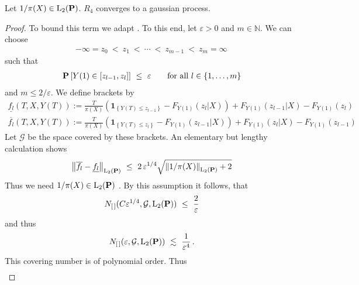 \begin{lemma}
  \label{aa:mean:l:r4}
  Let
  $1/\pi(X)\in\mathrm{L}_2(\P)$.
  $R_4$ converges to a gaussian process.
\end{lemma}
\begin{proof}
  To bound this term we adapt \cite[Example~19.6]{Vaart2000}.
  To this end, let $\varepsilon>0$ and $m\in\mathbb{N}$. We can choose
  \begin{gather}
  -\infty=z_0\ <\ z_1\ <\ \cdots\ <\ z_{m-1}\ <\ z_m=\infty
  \,
  \end{gather}
  such that
  \begin{gather}
    \P
    \left[ 
      Y(1)\in \left[ z_{l-1},z_l \right]
    \right]
    \ 
    \le
    \ 
    \varepsilon
    \qquad
    \text{for all}\ 
    l\in \left\{ 1,\ldots,m \right\}
  \end{gather}
  and $m \le 2/\varepsilon$.
  We define brackets by
  \begin{align}
    \underline{f_l}(T,X,Y(T))
    :=
    \frac{T}{\pi(X)}
    \left( 
      \mathbf{1}_{\left\{ Y(T)\le z_{l-1} \right\}}
      -
      F_{Y(1)}(z_l|X)
    \right)
    +
    F_{Y(1)}(z_{l-1}|X)
-
      F_{Y(1)}(z_l)
      \\
    \overline{f_l}(T,X,Y(T))
    :=
    \frac{T}{\pi(X)}
    \left( 
      \mathbf{1}_{\left\{ Y(T)\le z_{l} \right\}}
      -
      F_{Y(1)}(z_{l-1}|X)
    \right)
    +
    F_{Y(1)}(z_{l}|X)
-
F_{Y(1)}(z_{l-1})
  \end{align}
  Let $\mathcal{G}$ be the space covered by these brackets. 
  An elementary but lengthy calculation shows
  \begin{gather}
      \norm{
    \overline{f_l}
-
    \underline{f_l}
    }_{\mathrm{L}_2(\P)}
    \ 
    \le
    \ 
    2
    \,
    \varepsilon^{1/4}
    \sqrt{
      \norm{1/\pi(X)}_{\mathrm{L}_2(\P)}
      +
      2
    }
  \end{gather}
  Thus we need 
  $1/\pi(X)\in\mathrm{L}_2(\P)$
  . By this assumption it 
  follows, that
  \begin{gather}
    N_{[\,]}(C\varepsilon^{1/4}, \mathcal{G},\mathrm{L}_2(\P))
    \ 
    \le
    \ 
    \frac{2}{\varepsilon}
  \end{gather}
  and thus
\begin{gather}
    N_{[\,]}(\varepsilon, \mathcal{G},\mathrm{L}_2(\P))
    \ 
    \lesssim
    \ 
    \frac{1}{\varepsilon^4}  
    \,.
\end{gather}
This covering number is of polynomial order. Thus
\begin{gather}

\end{gather}
\end{proof}
